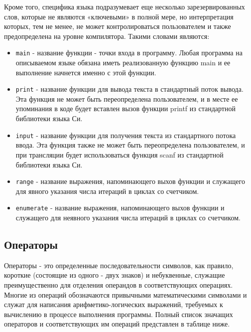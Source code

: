 Кроме того, специфика языка подразумевает еще несколько зарезервированных слов, которые не являются «ключевыми» в полной мере, но интерпретация которых, тем не менее, не может контролироваться пользователем и также предопределена на уровне компилятора.
Такими словами являются:

\begin{itemize}
    \item \verb|main| - название функции - точки входа в программу. Любая программа на описываемом языке обязана иметь реализованную функцию main и ее выполнение начнется именно с этой функции.
    \item \verb|print| - название функции для вывода текста в стандартный поток вывода. Эта функция не может быть переопределена пользователем, и в месте ее упоминания в коде будет вставлен вызов функции printf из стандартной библиотеки языка Си.
    \item \verb|input| - название функции для получения текста из стандартного потока ввода. Эта функция также не может быть переопределена пользователем, и при трансляции будет использоваться функция scanf из стандартной библиотеки языка Си.
    \item \verb|range| - название выражения, напоминающего выхов функции и служащего для явного указания числа итераций в циклах со счетчиком.
    \item \verb|enumerate| - название выражения, напоминающего выхов функции и служащего для неявного указания числа итераций в циклах со счетчиком.
\end{itemize}

\subsection{Операторы}
\label{sec:operators}

Операторы - это определенные последовательности символов, как правило, короткие (состоящие из одного - двух знаков) и небуквенные, служащие преимущественно для отделения операндов в соответствующих операциях.
Многие из операций обозначаются привычными математическими символами и служат для написания арифметико-логических выражений, требуемых к вычислению в процессе выполнения программы.
Полный список значащих операторов и соответствующих им операций представлен в таблице ниже.

